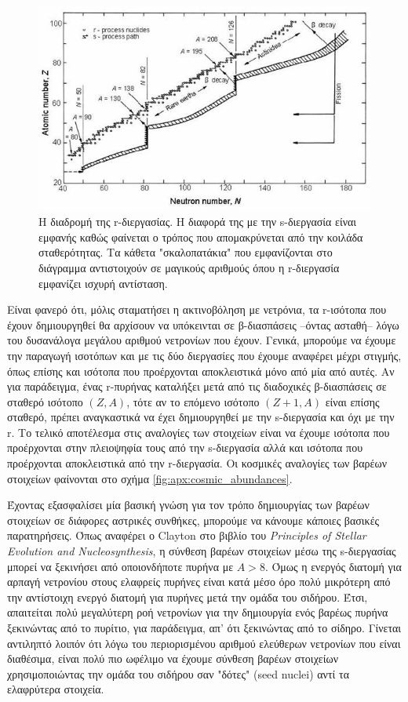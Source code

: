\begin{figure}
    \centering
    \includegraphics[scale=0.7]{Figures/processes.jpg}
    \caption{Η διαδρομή της r-διεργασίας. Η διαφορά της με την s-διεργασία είναι εμφανής καθώς φαίνεται ο τρόπος που απομακρύνεται από την κοιλάδα σταθερότητας. Τα κάθετα "σκαλοπατάκια" που εμφανίζονται στο διάγραμμα αντιστοιχούν σε μαγικούς αριθμούς όπου η r-διεργασία εμφανίζει ισχυρή αντίσταση.}
    \label{fig:apx:rprocess_path}
\end{figure}

Είναι φανερό ότι, μόλις σταματήσει η ακτινοβόληση με νετρόνια, τα r-ισότοπα που έχουν δημιουργηθεί θα αρχίσουν να υπόκεινται σε β-διασπάσεις --όντας ασταθή-- λόγω του δυσανάλογα μεγάλου αριθμού νετρονίων που έχουν. Γενικά, μπορούμε να έχουμε την παραγωγή ισοτόπων και με τις δύο διεργασίες που έχουμε αναφέρει μέχρι στιγμής, όπως επίσης και ισότοπα που προέρχονται αποκλειστικά μόνο από μία από αυτές. Αν για παράδειγμα, ένας r-πυρήνας καταλήξει μετά από τις διαδοχικές β-διασπάσεις σε σταθερό ισότοπο $(Z, A)$, τότε αν το επόμενο ισότοπο $(Z+1, A)$ είναι επίσης σταθερό, πρέπει αναγκαστικά να έχει δημιουργηθεί με την s-διεργασία και όχι με την r. 
Το τελικό αποτέλεσμα στις αναλογίες των στοιχείων είναι να έχουμε ισότοπα που προέρχονται στην πλειοψηφία τους από την s-διεργασία αλλά και ισότοπα που προέρχονται αποκλειστικά από την r-διεργασία. Οι κοσμικές αναλογίες των βαρέων στοιχείων φαίνονται στο σχήμα \ref{fig:apx:cosmic_abundances}.


Έχοντας εξασφαλίσει μία βασική γνώση για τον τρόπο δημιουργίας των βαρέων στοιχείων σε διάφορες αστρικές συνθήκες, μπορούμε να κάνουμε κάποιες βασικές παρατηρήσεις. Όπως αναφέρει ο Clayton στο βιβλίο του \textit{Principles of Stellar Evolution and Nucleosynthesis}, η σύνθεση βαρέων στοιχείων μέσω της s-διεργασίας μπορεί να ξεκινήσει από οποιονδήποτε πυρήνα με $A > 8$. Όμως η ενεργός διατομή για αρπαγή νετρονίου στους ελαφρείς πυρήνες είναι κατά μέσο όρο πολύ μικρότερη από την αντίστοιχη ενεργό διατομή για πυρήνες μετά την ομάδα του σιδήρου. Έτσι, απαιτείται πολύ μεγαλύτερη ροή νετρονίων για την δημιουργία ενός βαρέως πυρήνα ξεκινώντας από το πυρίτιο, για παράδειγμα, απ' ότι ξεκινώντας από το σίδηρο. Γίνεται αντιληπτό λοιπόν ότι λόγω του περιορισμένου αριθμού ελεύθερων νετρονίων που είναι διαθέσιμα, είναι πολύ πιο ωφέλιμο να έχουμε σύνθεση βαρέων στοιχείων χρησιμοποιώντας την ομάδα του σιδήρου σαν "δότες" (seed nuclei) αντί τα ελαφρύτερα στοιχεία. 

